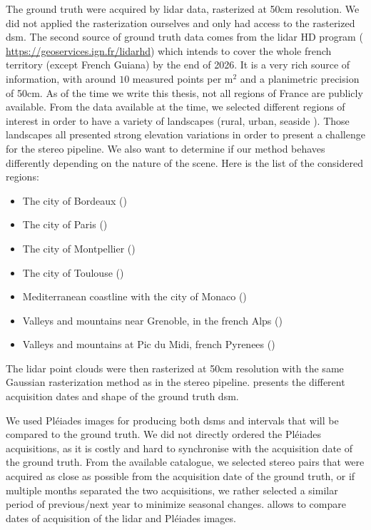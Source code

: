 The ground truth were acquired by \acrshort{lidar} data, rasterized at 50cm resolution. We did not applied the rasterization ourselves and only had access to the rasterized \acrshort{dsm}. The second source of ground truth data comes from the \acrshort{lidar} HD program (\cite{monnet_lidarhd_2023} \url{https://geoservices.ign.fr/lidarhd}) which intends to cover the whole french territory (except French Guiana) by the end of 2026. It is a very rich source of information, with around $10$ measured points per m$^2$ and a planimetric precision of 50cm. As of the time we write this thesis, not all regions of France are publicly available. From the data available at the time, we selected different regions of interest in order to have a variety of landscapes (rural, urban, seaside \etc). Those landscapes all presented strong elevation variations in order to present a challenge for the stereo pipeline. We also want to determine if our method behaves differently depending on the nature of the scene. Here is the list of the considered regions:
\begin{itemize}
    \item The city of Bordeaux ()
    \item The city of Paris ()
    \item The city of Montpellier ()
    \item The city of Toulouse ()
    \item Mediterranean coastline with the city of Monaco ()
    \item Valleys and mountains near Grenoble, in the french Alps ()
    \item Valleys and mountains at Pic du Midi, french Pyrenees ()
\end{itemize}
The \acrshort{lidar} point clouds were then rasterized at 50cm resolution with the same Gaussian rasterization method as in the stereo pipeline.  presents the different acquisition dates and shape of the ground truth \acrshort{dsm}.

We used Pléiades images for producing both \acrshort{dsm}s and intervals that will be compared to the ground truth. We did not directly ordered the Pléiades acquisitions, as it is costly and hard to synchronise with the acquisition date of the ground truth. From the available catalogue, we selected stereo pairs that were acquired as close as possible from the acquisition date of the ground truth, or if multiple months separated the two acquisitions, we rather selected a similar period of previous/next year to minimize seasonal changes.  allows to compare dates of acquisition of the \acrshort{lidar} and Pléiades images.

